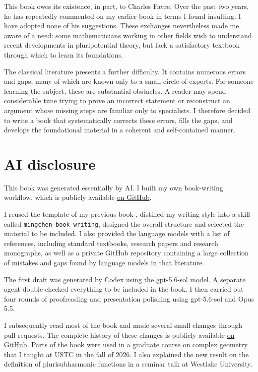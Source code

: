 \preface[Acknowledgements]
\label{sec:acknowledgements}

This book owes its existence, in part, to Charles Favre. Over the past two years, he has repeatedly commented on my earlier book \cite{XiaSampleBook} in terms I found insulting. I have adopted none of his suggestions. These exchanges nevertheless made me aware of a need: some mathematicians working in other fields wish to understand recent developments in pluripotential theory, but lack a satisfactory textbook through which to learn its foundations.

The classical literature presents a further difficulty. It contains numerous errors and gaps, many of which are known only to a small circle of experts. For someone learning the subject, these are substantial obstacles. A reader may spend considerable time trying to prove an incorrect statement or reconstruct an argument whose missing steps are familiar only to specialists. I therefore decided to write a book that systematically corrects these errors, fills the gaps, and develops the foundational material in a coherent and self-contained manner.

\section*{AI disclosure}
This book was generated essentially by AI. I built my own book-writing workflow, which is publicly available \href{https://github.com/MingchenXia/math-book-template}{on GitHub}.

I reused the template of my previous book \cite{XiaSampleBook}, distilled my writing style into a skill called \texttt{mingchen-book-writing}, designed the overall structure and selected the material to be included. I also provided the language models with a list of references, including standard textbooks, research papers and research monographs, as well as a private GitHub repository containing a large collection of mistakes and gaps found by language models in that literature.

The first draft was generated by Codex using the gpt-5.6-sol model. A separate agent double-checked everything to be included in the book. I then carried out four rounds of proofreading and presentation polishing using gpt-5.6-sol and Opus 5.5.

I subsequently read most of the book and made several small changes through pull requests. The complete history of these changes is publicly available \href{https://github.com/MingchenXia/foundations-of-pluripotential-theory}{on GitHub}. Parts of the book were used in a graduate course on complex geometry that I taught at USTC in the fall of 2026. I also explained the new result on the definition of plurisubharmonic functions in a seminar talk at Westlake University.


